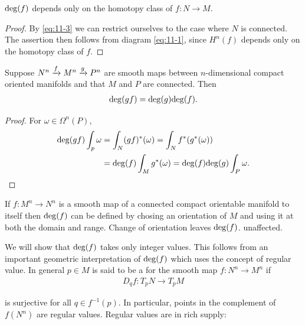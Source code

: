 \begin{corollary}\label{corollary:11-2}
  $\mathrm{deg}(f)$ depends only on the homotopy class of $f:N\to M$.
\end{corollary}

\begin{proof}
  By \eqref{eq:11-3} we can restrict ourselves to the case where $N$ is connected.
The assertion then follows from diagram \eqref{eq:11-1}, since $H^n(f)$ depends only on the
homotopy class of $f$.
\end{proof}

\begin{corollary}\label{corollary:11-3}
  Suppose $N^n\xra[f]M^n\xra[g]P^n$ are smooth maps between $n$-dimensional compact 
  oriented manifolds and that $M$ and $P$ are connected. Then 
  \begin{align*}
    \mathrm{deg}(gf) = \mathrm{deg}(g)\mathrm{deg}(f).
  \end{align*}
\end{corollary}

\begin{proof}
  For $\omega\in\Omega^n(P)$, 
  \begin{align*}
    \mathrm{deg}(gf)\int_p\omega 
    & = \int_N(gf)^*(\omega)
      = \int_N f^*(g^*(\omega)) \\
    & = \mathrm{deg}(f)\int_M g^*(\omega)
      = \mathrm{deg}(f)\mathrm{deg}(g)\int_P\omega.
  \end{align*}
\end{proof}

\begin{remark}\label{remark:11-4}
  If $f:M^n\to N^n$ is a smooth map of a connected compact orientable
manifold to itself then $\mathrm{deg}(f)$ can be defined by chosing an orientation of $M$ and
using it at both the domain and range. Change of orientation leaves $\mathrm{deg}(f)$.
unaffected.
\end{remark}

We will show that $\mathrm{deg}(f)$ takes only integer values. This follows from an important geometric 
interpretation of $\mathrm{deg}(f)$ which uses the concept of regular value. In general $p\in M$ is said 
to be a  for the smooth map $f:N^n\to M^n$ if
\begin{align*}
  D_qf:T_pN\to T_pM
\end{align*}

is surjective for all $q\in f^{-1}(p)$. In particular, points in the complement of $f(N^n)$
are regular values. Regular values are in rich supply:

